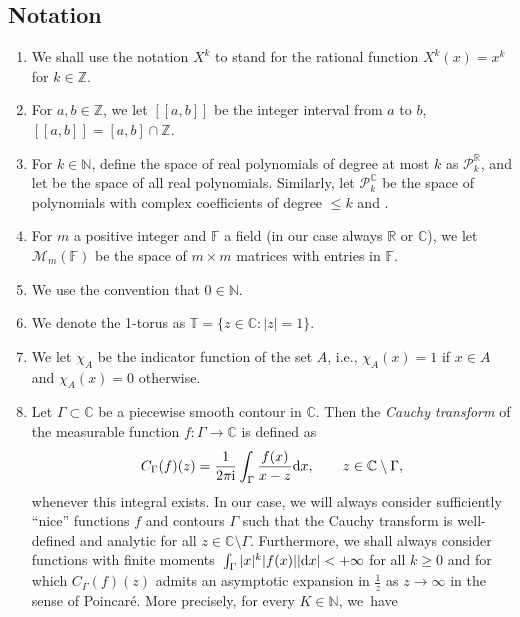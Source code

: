 \subsection{Notation}
\begin{enumerate}\itemsep=0pt
\item[(1)] We shall use the notation $\mathit{X}^k$ to stand for the rational function $\mathit{X}^k(x) = x^k$ for $k \in \mathbb{Z}$.
\item[(2)] For $a,b \in \mathbb{Z}$, we let $[\![a,b]\!]$ be the integer interval from $a$ to $b$, $[\![a,b]\!] = [a,b] \cap \mathbb{Z}$.
\item[(3)] For $k \in \mathbb{N}$, define the space of real polynomials of degree at most $k$ as
$\mathscr{P}_{k}^\mathbb{R}$, and let
 be the space of all real polynomials. Similarly, let $\mathscr{P}^\mathbb{C}_k$ be the space of polynomials with complex coefficients of degree $\leq k$ and .
\item[(4)] For $m$ a positive integer and $\mathbb{F}$ a field (in our case always $\mathbb{R}$ or $\mathbb{C}$), we let $\mathcal{M}_m (\mathbb{F})$ be the space of $m \times m$ matrices with entries in $\mathbb{F}$.
\item[(5)] We use the convention that $0 \in \mathbb{N}$.
\item[(6)] We denote the 1-torus as $\mathbb{T} = \{ z \in \mathbb{C} \colon |z|=1 \}$.
\item[(7)] We let $\chi_A$ be the indicator function of the set $A$, i.e., $\chi_A(x) = 1$ if $x \in A$ and $\chi_A(x) = 0$ otherwise.
\item[(8)] Let $\Gamma \subset \mathbb{C}$ be a piecewise smooth contour in $\mathbb{C}$. Then the \textit{Cauchy transform} of the measurable function $f\colon \Gamma \longrightarrow \mathbb{C}$ is defined as
\[
C_\Gamma (f) (z) = \frac{1}{2\pi {\rm i}}\int_\Gamma \frac{f(x)}{x-z} {\rm d}x,\qquad z \in \mathbb{C}\setminus \Gamma,
\]
whenever this integral exists. In our case, we will always consider sufficiently \enquote{nice} functions $f$ and contours $\Gamma$ such that the Cauchy transform is well-defined and analytic for all $z \in \mathbb{C}\setminus \Gamma$. Furthermore, we shall always consider functions with finite moments~${\int_\Gamma |x|^k |f(x)| |{\rm d}x| < +\infty}$ for all $k\geq 0$ and for which $C_\Gamma (f)(z)$ admits an asymptotic expansion in $\frac{1}{z}$ as $z \to \infty$ in the sense of Poincar\'e. More precisely, for every $K \in \mathbb{N}$, we~have

\end{enumerate}
